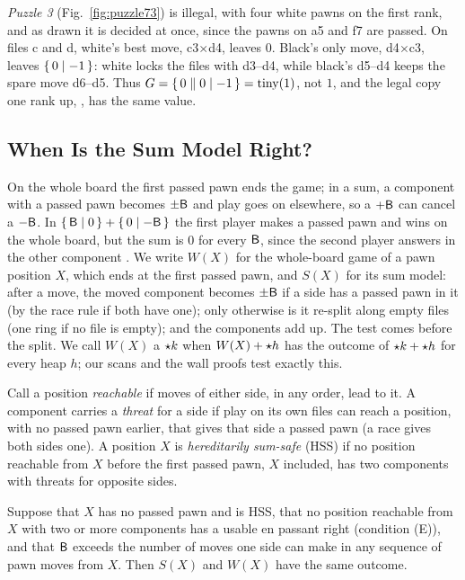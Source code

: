 \emph{Puzzle 3} (Fig.~\ref{fig:puzzle73}) is illegal, with four white pawns on the first rank, and as drawn it
is decided at once, since the pawns on a5 and f7 are passed. On files c and d, white's best move, c3$\times$d4,
leaves $0$. Black's only move, d4$\times$c3, leaves $\{\,0 \mid -1\,\}$: white locks the files with d3--d4, while
black's d5--d4 keeps the spare move d6--d5. Thus $G=\{\,0 \parallel 0\mid -1\,\}=\operatorname{tiny}(1)$, not $1$, and the legal copy
one rank up, , has the same value.

\subsection{When Is the Sum Model Right?}\label{sec:sums-hss}

On the whole board the first passed pawn ends the game; in a sum, a component with a passed pawn becomes $\pm\mathsf{B}$ and
play goes on elsewhere, so a $+\mathsf{B}$ can cancel a $-\mathsf{B}$. In $\{\,\mathsf{B} \mid 0\,\}+\{\,0 \mid -\mathsf{B}\,\}$ the first player
makes a passed pawn and wins on the whole board, but the sum is $0$ for every $\mathsf{B}$, since the second player
answers in the other component . We write $W(X)$ for the whole-board game of a pawn position $X$, which ends at
the first passed pawn, and $S(X)$ for its sum model: after a move, the moved component becomes $\pm\mathsf{B}$ if a
side has a passed pawn in it (by the race rule if both have one); only otherwise is it re-split along empty files (one ring
if no file is empty); and the components add up. The test comes before the split. We call $W(X)$ a $\mathord{\star k}$ when $W(X)+\mathord{\star h}$ has
the outcome of $\mathord{\star k}+\mathord{\star h}$ for every heap $h$; our scans and the wall proofs test exactly this.

\begin{definition}\label{def:hss}
Call a position \emph{reachable} if moves of either side, in any order, lead to it. A component carries a
\emph{threat} for a side if play on its own files can reach a position, with no passed pawn earlier, that gives that side a passed pawn (a race gives both sides one). A position $X$ is
\emph{hereditarily sum-safe} (HSS) if no position reachable from $X$ before the first passed pawn, $X$ included, has two components with threats for opposite sides.
\end{definition}

\begin{theorem}\label{thm:hss}
Suppose that $X$ has no passed pawn and is HSS, that no position reachable from $X$ with two or more components has a usable en
passant right (condition (E)), and that $\mathsf{B}$ exceeds the number of moves one side can make in any sequence of pawn moves from $X$. Then $S(X)$ and $W(X)$ have the same
outcome.
\end{theorem}

